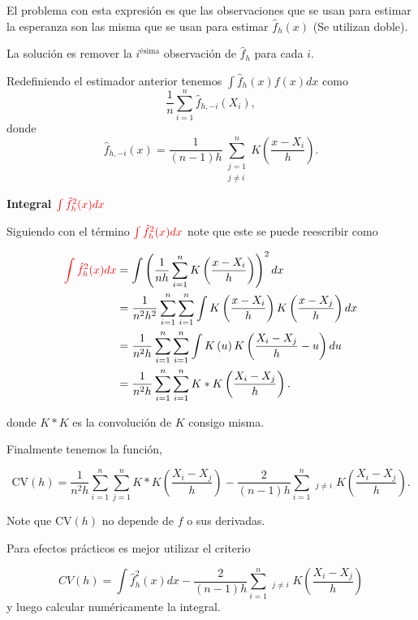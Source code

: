 \documentclass[
  12pt,
]{book}
\theoremstyle{definition}
\theoremstyle{definition}
\theoremstyle{definition}
\theoremstyle{remark}
\let\BeginKnitrBlock\begin \let\EndKnitrBlock\end
\begin{document}
\BeginKnitrBlock{remark}
{}El problema con esta expresión es que las observaciones que se usan para estimar la esperanza son las misma que se usan para estimar \(\hat{f}_{h}(x)\) (Se utilizan doble).
\EndKnitrBlock{remark}

La solución es remover la \(i^{\text{ésima}}\) observación de \(\hat{f}_{h}\) para cada \(i\).

Redefiniendo el estimador anterior tenemos \(\int \hat{f}_{h}(x)f(x)dx\) como
\[
\frac{1}{n}\sum_{i=1}^{n}\hat{f}_{h,-i}(X_{i}),
\]
donde
\[
\hat{f}_{h,-i}(x)=\frac{1}{(n-1)h}\sum_{\substack{j=1\\ j\neq i}}^{n}K\left( \frac{x-X_{i}}{h} \right) .
\]

\textbf{Integral \(\textcolor{red}{\int\hat{f}_{h}^{2}(x)dx}\)}

Siguiendo con el término \(\textcolor{red}{\int\hat{f}_{h}^{2}(x)dx}\) note que este se puede reescribir como

\begin{align*}
\textcolor{red}{\int\hat{f}_{h}^{2}(x)dx}
& =\int\left(\frac{1}{nh}\sum_{i=1}^{n}K\left( \frac{x-X_{i}}{h} \right)\right)^{2}dx                                    \\
& =\frac{1}{n^{2}h^{2}}\sum_{i=1}^{n}\sum_{i=1}^{n}\int K\left(\frac{x-X_{i}}{h}\right)K\left(\frac{x-X_{j}}{h}\right)dx \\
& =\frac{1}{n^{2}h}\sum_{i=1}^{n}\sum_{i=1}^{n}\int K\left(u\right)K\left(\frac{X_{i}-X_{j}}{h}-u\right)du               \\
& =\frac{1}{n^{2}h}\sum_{i=1}^{n}\sum_{i=1}^{n}K*K\left(\frac{X_{i}-X_{j}}{h}\right).
\end{align*}

donde \(K*K\) es la convolución de \(K\) consigo misma.

Finalmente tenemos la función,

\[
\mathrm{CV}(h)=\frac{1}{n^{2}h}\sum_{i=1}^{n}\sum_{j=1}^{n}K*K\left(\frac{X_{i}-X_{j}}{h}\right)-\frac{2}{(n-1)h}\sum_{i=1}^{n}\mathop{\sum_{j=1}^{n}}_{j\neq i}K\left( \frac{X_{i}-X_{j}}{h} \right).
\]

\BeginKnitrBlock{remark}
{}Note que \(\mathrm{CV}(h)\) no depende de \(f\) o sus derivadas.
\EndKnitrBlock{remark}

\BeginKnitrBlock{remark}
{}Para efectos prácticos es mejor utilizar el criterio

\[
CV(h)=\int\hat{f}_{h}^{2}(x)dx-\frac{2}{(n-1)h}\sum_{i=1}^{n}\mathop{\sum_{j=1}^{n}}_{j\neq i}K\left( \frac{X_{i}-X_{j}}{h} \right)
\]
y luego calcular numéricamente la integral.
\EndKnitrBlock{remark}
\end{document}
